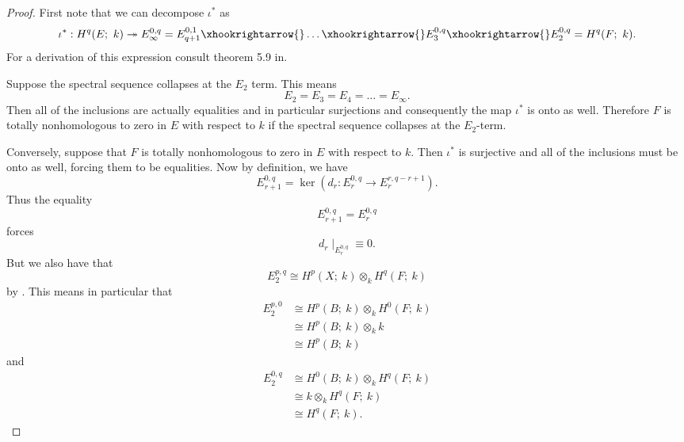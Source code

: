 \begin{proof}
    First note that we can decompose $\iota^*$ as 
    \begin{equation*}
        \iota^*: H^q(E;\ k) \twoheadrightarrow E^{0,q}_\infty = E^{0,1}_{q+1} \xhookrightarrow{} \dots \xhookrightarrow{} E_3^{0,q} \xhookrightarrow{} E^{0,q}_2 = H^q(F; \ k).
    \end{equation*}
    For a derivation of this expression consult theorem 5.9 in\cite{mccleary}. 
    
    Suppose the spectral sequence collapses at the $E_2$ term. This means 
    \begin{equation*}
        E_2 = E_3 = E_4 = \dots = E_\infty.
    \end{equation*}Then all of the inclusions are actually equalities and in particular surjections and consequently the map $\iota^*$ is onto as well. Therefore $F$ is totally nonhomologous to zero in $E$ with respect to $k$ if the spectral sequence collapses at the $E_2$-term.

    Conversely, suppose that $F$ is totally nonhomologous to zero in $E$ with respect to $k$. Then $\iota^*$ is surjective and all of the inclusions must be onto as well, forcing them to be equalities. Now by definition, we have 
    \begin{equation*}
        E_{r+1}^{0,q} = \ker\left(d_r: E_r^{0,q}\to E_r^{r, q-r+1}\right).
    \end{equation*}
     Thus the equality 
    \begin{equation*}
        E_{r+1}^{0,q} = E_{r}^{0,q}
    \end{equation*}
    forces 
    \begin{equation*}
        d_r \mid _{E_r^{0,q}} \equiv 0.
    \end{equation*}
   But we also have that
    \begin{equation}\label{superpower}
        E_2^{p,q}\cong H^p(X;\ k)\otimes_k H^q(F;\ k)
    \end{equation}
    by .
    This means in particular that
    \begin{equation}\label{oans}
        \begin{align*}
        E^{p,0}_2 &\cong H^p{(B;\ k)} \otimes_k H^0(F;\ k)\\
        & \cong H^p{(B;\ k)} \otimes_k k\\
        & \cong H^p{(B;\ k)}
    \end{align*}
    \end{equation} 
    and
    \begin{equation}\label{zwoa}
        \begin{align}
        E^{0,q}_2 &\cong H^0(B;\ k) \otimes_k H^q(F;\ k)\\
        & \cong k \otimes_k H^q(F; \ k)\\
        & \cong  H^q(F; \ k).
    \end{align}
    \end{equation}
    

\end{proof}
